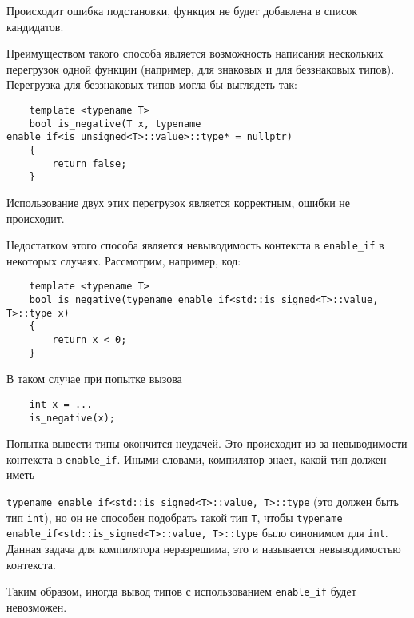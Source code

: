 	Происходит ошибка подстановки, функция не будет добавлена в список кандидатов.
	
	\vspace{\baselineskip}
	
	Преимуществом такого способа является возможность написания нескольких перегрузок одной функции (например, для знаковых и для беззнаковых типов). Перегрузка для беззнаковых типов могла бы выглядеть так:
	
	\begin{verbatim}
	template <typename T>
	bool is_negative(T x, typename enable_if<is_unsigned<T>::value>::type* = nullptr)
	{
		return false;
	}
	\end{verbatim}
	
	Использование двух этих перегрузок является корректным, ошибки не происходит.
	
	\vspace{\baselineskip}
	
	Недостатком этого способа является невыводимость контекста в \texttt{enable_if} в некоторых случаях. Рассмотрим, например, код:
	
	\begin{verbatim}
	template <typename T>
	bool is_negative(typename enable_if<std::is_signed<T>::value, T>::type x)
	{
		return x < 0;
	}
	\end{verbatim}
	
	В таком случае при попытке вызова
	
	\begin{verbatim}
	int x = ...
	is_negative(x);
	\end{verbatim}
	
	Попытка вывести типы окончится неудачей. Это происходит из-за невыводимости контекста в \texttt{enable_if}. Иными словами, компилятор знает, какой тип должен иметь 
	
	\texttt{typename enable_if<std::is_signed<T>::value, T>::type} (это должен быть тип \texttt{int}), но он не способен подобрать такой тип \texttt{T}, чтобы \texttt{typename enable_if<std::is_signed<T>::value, T>::type} было синонимом для \texttt{int}. Данная задача для компилятора неразрешима, это и называется невыводимостью контекста.
	
	Таким образом, иногда вывод типов с использованием \texttt{enable_if} будет невозможен.
	

